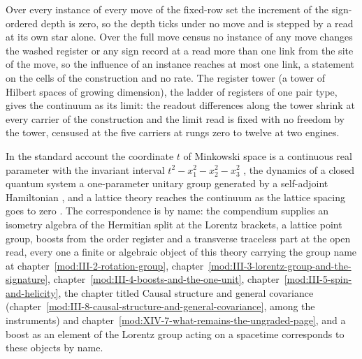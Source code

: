 Over every instance of every move of the fixed-row set the increment of the sign-ordered depth is zero, so the depth ticks under no move and is stepped by a read at its own star alone.
Over the full move census no instance of any move changes the washed register or any sign record at a read more than one link from the site of the move, so the influence of an instance reaches at most one link, a statement on the cells of the construction and no rate.
The register tower (a tower of Hilbert spaces of growing dimension), the ladder of registers of one pair type, gives the continuum as its limit: the readout differences along the tower shrink at every carrier of the construction and the limit read is fixed with no freedom by the tower, censused at the five carriers at rungs zero to twelve at two engines.
\begin{chbridge}
In the standard account the coordinate $t$ of Minkowski space is a continuous real parameter with the invariant interval $t^2 - x_1^2 - x_2^2 - x_3^2$ \cite{Minkowski1908}, the dynamics of a closed quantum system a one-parameter unitary group generated by a self-adjoint Hamiltonian \cite{Stone1932}, and a lattice theory reaches the continuum as the lattice spacing goes to zero \cite{Wilson1974}. The correspondence is by name: the compendium supplies an isometry algebra of the Hermitian split at the Lorentz brackets, a lattice point group, boosts from the order register and a transverse traceless part at the open read, every one a finite or algebraic object of this theory carrying the group name at chapter~\ref{mod:III-2-rotation-group}, chapter~\ref{mod:III-3-lorentz-group-and-the-signature}, chapter~\ref{mod:III-4-boosts-and-the-one-unit}, chapter~\ref{mod:III-5-spin-and-helicity}, the chapter titled Causal structure and general covariance (chapter~\ref{mod:III-8-causal-structure-and-general-covariance}, among the instruments) and chapter~\ref{mod:XIV-7-what-remains-the-ungraded-page}, and a boost as an element of the Lorentz group acting on a spacetime corresponds to these objects by name.
\end{chbridge}
